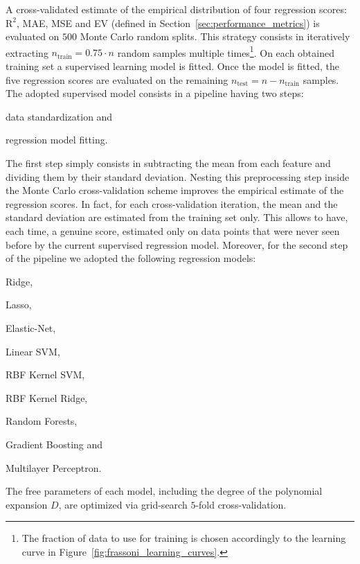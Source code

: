 A cross-validated estimate of the empirical distribution of four regression scores: $\text{R}^2$, MAE, MSE and EV (defined in Section~\ref{sec:performance_metrics}) is evaluated on $500$ Monte Carlo random splits.
This strategy consists in iteratively extracting $n_{\text{train}} = 0.75 \cdot n$ random samples multiple times\footnote{ The fraction of data to use for training is chosen accordingly to the learning curve in Figure~\ref{fig:frassoni_learning_curves}.}. On each obtained training set a supervised learning model is fitted.
Once the model is fitted, the five regression scores are evaluated on the remaining $n_{\text{test}} = n - n_{\text{train}}$ samples.
The adopted supervised model consists in a pipeline having two steps:
\begin{enumerate*}[label=(\roman*)]
	\item data standardization and
	\item regression model fitting.
\end{enumerate*}
The first step simply consists in subtracting the mean from each feature and dividing them by their standard deviation. Nesting this preprocessing step inside the Monte Carlo cross-validation scheme improves the empirical estimate of the regression scores. In fact, for each cross-validation iteration, the mean and the standard deviation are estimated from the training set only. This allows to have, each time, a genuine score, estimated only on data points that were never seen before by the current supervised regression model.
Moreover, for the second step of the pipeline we adopted the following regression models:
\begin{enumerate*}[label=(\alph*)]
	\item Ridge,
	\item Lasso,
	\item Elastic-Net,
	\item Linear SVM,
	\item RBF Kernel SVM,
	\item RBF Kernel Ridge,
	\item Random Forests,
	\item Gradient Boosting and
	\item Multilayer Perceptron.
\end{enumerate*}
The free parameters of each model, including the degree of the polynomial expansion $D$, are optimized via grid-search $5$-fold cross-validation.

